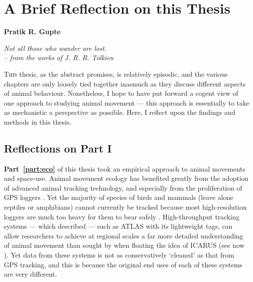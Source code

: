 
%
\chapter{A Brief Reflection on this Thesis}\label{ch:discussion}

{\noindent \textbf{Pratik R. Gupte}}

\begin{center}
\emph{Not all those who wander are lost.\\
\medskip
-- \small{from the works of J. R. R. Tolkien}}
\end{center}

\lettrine{T}{his} thesis, as the abstract promises, is relatively episodic, and the various chapters are only loosely tied together inasmuch as they discuss different aspects of animal behaviour.
Nonetheless, I hope to have put forward a cogent view of one approach to studying animal movement --- this approach is essentially to take as mechanistic a perspective as possible.
Here, I reflect upon the findings and methods in this thesis.

\section*{Reflections on Part I}

\textbf{Part~\ref{part:eco}} of this thesis took an empirical approach to animal movements and space-use.
Animal movement ecology has benefited greatly from the adoption of advanced animal tracking technology, and especially from the proliferation of GPS loggers \citep{cagnacci2010}.
Yet the majority of species of birds and mammals (leave alone reptiles or amphibians) cannot currently be tracked because most high-resolution loggers are much too heavy for them to bear safely \parencite{kays2015}.
High-throughput tracking systems --- which \textcite{nathan2022} described --- such as ATLAS with its lightweight tags, can allow researchers to achieve at regional scales a far more detailed understanding of animal movement than sought by \textcite{wikelski2007} when floating the idea of ICARUS (see now \cite{jetz2022}).
Yet data from these systems is not as conservatively `cleaned' as that from GPS tracking, and this is because the original end uses of each of these systems are very different.

